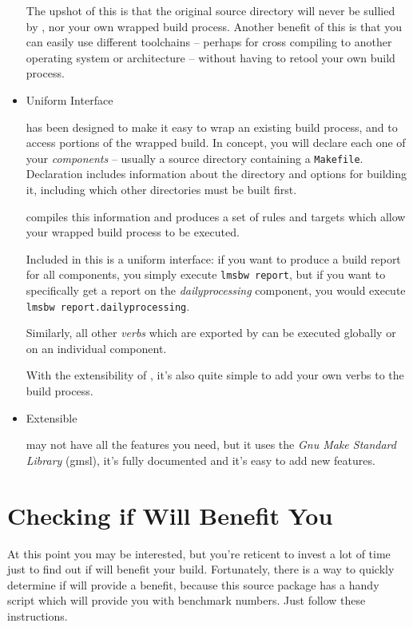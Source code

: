 \begin{itemize}
  The upshot of this is that the original source directory will never
  be sullied by \lmsbw, nor your own wrapped build process.  Another
  benefit of this is that you can easily use different toolchains --
  perhaps for cross compiling to another operating system or
  architecture -- without having to retool your own build process.

\item Uniform Interface

  \lmsbw has been designed to make it easy to wrap an existing build
  process, and to access portions of the wrapped build.  In concept,
  you will declare each one of your \emph{components} -- usually a source
  directory containing a \texttt{Makefile}.  Declaration includes
  information about the directory and options for building it,
  including which other directories must be built first.

  \lmsbw compiles this information and produces a set of \make rules
  and targets which allow your wrapped build process to be executed.

  Included in this is a uniform interface: if you want to produce a
  build report for all components, you simply execute \texttt{lmsbw
    report}, but if you want to specifically get a report on the
  \emph{dailyprocessing} component, you would execute \texttt{lmsbw
    report.dailyprocessing}.

  Similarly, all other \emph{verbs} which are exported by \lmsbw can
  be executed globally or on an individual component.

  With the extensibility of \lmsbw, it's also quite simple to add your
  own verbs to the build process.

\item Extensible

  \lmsbw may not have all the features you need, but it uses the
  \emph{Gnu Make Standard Library} (gmsl), it's fully documented and
  it's easy to add new features.

\end{itemize}

\section{Checking if \lmsbw Will Benefit You}

At this point you may be interested, but you're reticent to invest a
lot of time just to find out if \lmsbw will benefit your build.
Fortunately, there is a way to quickly determine if \lmsbw will
provide a benefit, because this source package has a handy script
which will provide you with benchmark numbers.  Just follow these
instructions.

